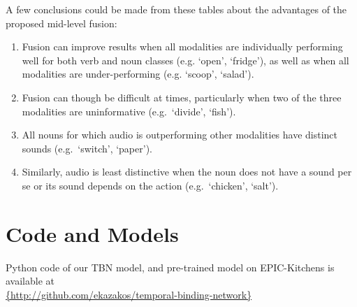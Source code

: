 \documentclass[10pt,twocolumn,letterpaper]{article}
\begin{document}
A few conclusions could be made from these tables about the advantages of the proposed mid-level fusion:
\begin{enumerate}
\item Fusion can improve results when all modalities are individually performing well for both verb and noun classes (e.g. `open', `fridge'), as well as when all modalities are under-performing (e.g. `scoop', `salad').
\item Fusion can though be difficult at times, particularly when two of the three modalities are uninformative (e.g.~`divide', `fish').
\item All nouns for which audio is outperforming other modalities have distinct sounds (e.g.~`switch', `paper').
\item Similarly, audio is least distinctive when the noun does not have a sound per se or its sound depends on the action (e.g.~`chicken', `salt').
\end{enumerate}

\section{Code and Models}
Python code of our TBN model, and pre-trained model on EPIC-Kitchens is available at\\ \url{{http://github.com/ekazakos/temporal-binding-network}}
\end{document}
